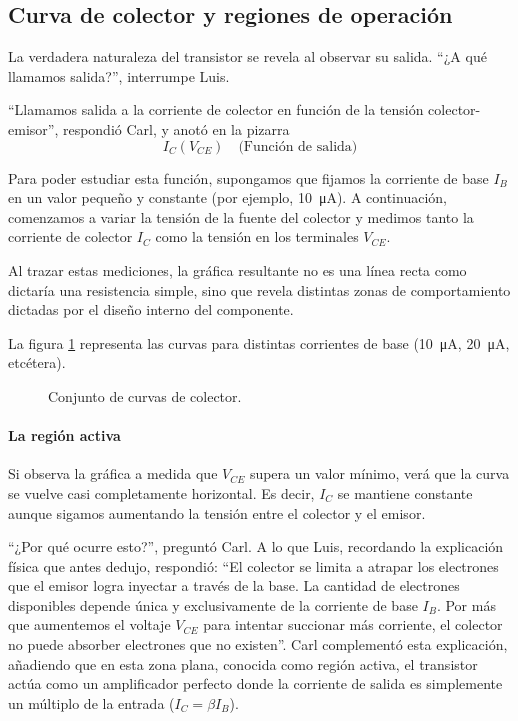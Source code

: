 \subsection{Curva de colector y regiones de operación}

La verdadera naturaleza del transistor se revela al observar su salida. ``¿A qué llamamos salida?'', interrumpe Luis.

``Llamamos salida a la corriente de colector en función de la tensión colector-emisor'', respondió Carl, y anotó en la pizarra
\[
  I_C(V_{CE}) \quad \text{(Función de salida)}
\]

Para poder estudiar esta función, supongamos que fijamos la corriente de base \(I_B\) en un valor pequeño y constante (por ejemplo, \qty{10}{\micro\ampere}). A continuación, comenzamos a variar la tensión de la fuente del colector y medimos tanto la corriente de colector \(I_C\) como la tensión en los terminales \(V_{CE}\). 

Al trazar estas mediciones, la gráfica resultante no es una línea recta como dictaría una resistencia simple, sino que revela distintas zonas de comportamiento dictadas por el diseño interno del componente.

La figura \ref{fig_curvas_de_colector} representa las curvas para distintas corrientes de base (\qty{10}{\micro\ampere}, \qty{20}{\micro\ampere}, etcétera).

\begin{figure}[!ht]
  \centering
  
  \caption{Conjunto de curvas de colector.}
  \label{fig_curvas_de_colector}
\end{figure}

\paragraph{La región activa}
Si observa la gráfica a medida que \(V_{CE}\) supera un valor mínimo, verá que la curva se vuelve casi completamente horizontal. Es decir, \(I_C\) se mantiene constante aunque sigamos aumentando la tensión entre el colector y el emisor. 

``¿Por qué ocurre esto?'', preguntó Carl. A lo que Luis, recordando la explicación física que antes dedujo, respondió: ``El colector se limita a atrapar los electrones que el emisor logra inyectar a través de la base. La cantidad de electrones disponibles depende única y exclusivamente de la corriente de base \(I_B\). Por más que aumentemos el voltaje \(V_{CE}\) para intentar succionar más corriente, el colector no puede absorber electrones que no existen''. Carl complementó esta explicación, añadiendo que en esta zona plana, conocida como región activa, el transistor actúa como un amplificador perfecto donde la corriente de salida es simplemente un múltiplo de la entrada (\(I_C = \beta I_B\)).

